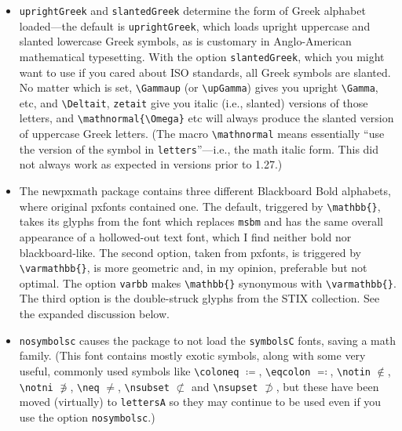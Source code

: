 \documentclass[11pt]{article}
\theoremstyle{oldplain}
\theoremstyle{plain}
\begin{document}
\begin{itemize}
\begin{verbatim}
\usepackage{newpxmath}
\end{verbatim}
causes no error, unlike the same combination with {\tt pxfonts}, but does nothing significant. The package {\tt newpxmath} loads the package {\tt amsmath} if it was not previously loaded. Options to {\tt amsmath} such as {\tt leqno,intlimits} may be passed to {\tt amsmath} via options to the documentclass. 
\item {\tt uprightGreek} and {\tt slantedGreek} determine the form of Greek alphabet loaded---the default is {\tt uprightGreek}, which loads upright uppercase and slanted lowercase Greek symbols, as is customary in Anglo-American mathematical typesetting. With the option {\tt slantedGreek}, which you might want to use if you cared about ISO standards, all Greek symbols are slanted. No matter which is set, \verb|\Gammaup| (or \verb|\upGamma|) gives you upright \verb|\Gamma|, etc, and \verb|\Deltait|, \verb|zetait| give you italic (i.e., slanted) versions of those letters, and \verb|\mathnormal{\Omega}| etc will always produce the slanted version of uppercase Greek letters. (The macro \verb|\mathnormal| means essentially ``use the version of the symbol in {\tt letters}''---i.e., the math italic form. This did not always work as expected in versions prior to 1.27.)
\item The \textsf{newpxmath} package contains three different Blackboard Bold alphabets, where original \textsf{pxfonts} contained one. The default, triggered by \verb|\mathbb{}|, takes its glyphs from the font which replaces {\tt msbm} and has the same overall appearance of a hollowed-out text font, which I find neither bold nor blackboard-like. The second option, taken from \textsf{pxfonts}, is triggered by \verb|\varmathbb{}|, is more geometric and, in my opinion, preferable but not optimal. The option {\tt varbb} makes \verb|\mathbb{}| synonymous with \verb|\varmathbb{}|. The third option is the double-struck glyphs from the STIX collection. See the expanded discussion below.
\item {\tt nosymbolsc} causes the package to not load the {\tt symbolsC} fonts, saving  a math family. (This font contains mostly exotic symbols, along with some very useful, commonly used symbols like \verb|\coloneq| $\coloneq$, \verb|\eqcolon| $\eqcolon$, \verb|\notin| $\notin$, \verb|\notni| $\notni$, \verb|\neq| $\neq$, \verb|\nsubset| $\nsubset$ and \verb|\nsupset| $\nsupset$, but these have been moved (virtually) to {\tt lettersA} so they may continue to be used even if you use the option {\tt nosymbolsc}.)

\end{itemize}
\end{document}
